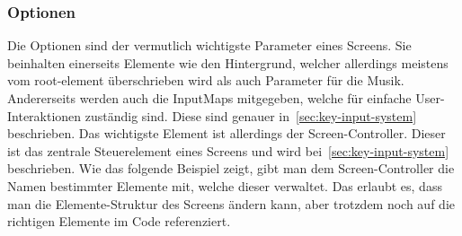 \subsubsection{Optionen}\label{subsubsec:optionen}
\renewcommand{\kapitelautor}{Autor: Felix Zwickelstorfer}
Die Optionen sind der vermutlich wichtigste Parameter eines Screens.
Sie beinhalten einerseits Elemente wie den Hintergrund, welcher allerdings meistens vom root-element überschrieben wird als auch Parameter für die Musik.
Andererseits werden auch die InputMaps mitgegeben, welche für einfache User-Interaktionen zuständig sind.
Diese sind genauer in~\ref{sec:key-input-system} beschrieben.
Das wichtigste Element ist allerdings der Screen-Controller.
Dieser ist das zentrale Steuerelement eines Screens und wird bei~\ref{sec:key-input-system} beschrieben. %
Wie das folgende Beispiel zeigt, gibt man dem Screen-Controller die Namen bestimmter Elemente mit, welche dieser verwaltet.
Das erlaubt es, dass man die Elemente-Struktur des Screens ändern kann, aber trotzdem noch auf die richtigen Elemente im Code referenziert.

